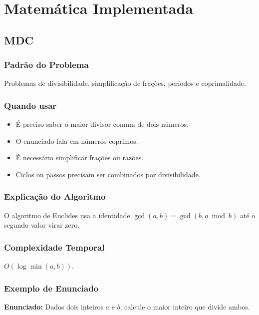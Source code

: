 \chapter{Matemática Implementada}

\section{MDC}

\subsection{Padrão do Problema}
Problemas de divisibilidade, simplificação de frações, períodos e coprimalidade.

\subsection{Quando usar}
\begin{itemize}[nosep]
  \item É preciso saber o maior divisor comum de dois números.
  \item O enunciado fala em números coprimos.
  \item É necessário simplificar frações ou razões.
  \item Ciclos ou passos precisam ser combinados por divisibilidade.
\end{itemize}

\subsection{Explicação do Algoritmo}
O algoritmo de Euclides usa a identidade $\gcd(a,b)=\gcd(b,a\bmod b)$ até o segundo valor virar zero.

\subsection{Complexidade Temporal}
$O(\log \min(a,b))$.

\subsection{Exemplo de Enunciado}
\begin{exemplodiabox}
\textbf{Enunciado:} Dados dois inteiros $a$ e $b$, calcule o maior inteiro que divide ambos.
\end{exemplodiabox}

